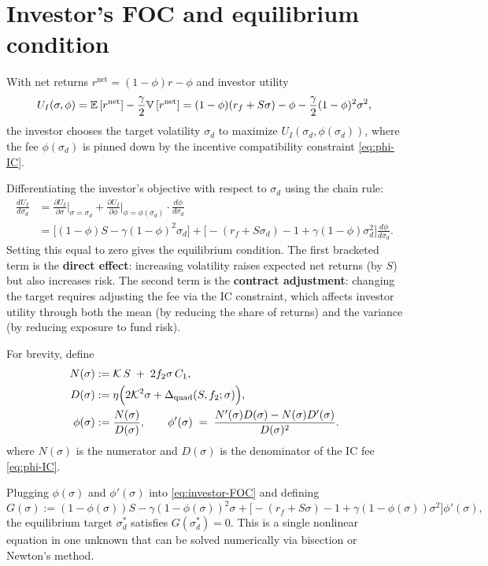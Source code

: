 \section{Investor’s FOC and equilibrium condition}
\label{app:investor}
With net returns $r^{\text{net}}=(1-\phi)r-\phi$ and investor utility
\[
U_I(\sigma,\phi)={\mathbb{E}}\,[r^{\text{net}}] - \frac{\gamma}{2}{\mathbb{V}}\,[r^{\text{net}}] = (1-\phi)(r_f+S\sigma)-\phi-\frac{\gamma}{2}(1-\phi)^2\sigma^2,
\]
the investor chooses the target volatility $\sigma_d$ to maximize $U_I(\sigma_d,\phi(\sigma_d))$, where the fee $\phi(\sigma_d)$ is pinned down by the incentive compatibility constraint \eqref{eq:phi-IC}.

Differentiating the investor's objective with respect to $\sigma_d$ using the chain rule:
\begin{align}
\frac{d U_I}{d \sigma_d} &= \frac{\partial U_I}{\partial \sigma}\Big|_{\sigma=\sigma_d} + \frac{\partial U_I}{\partial \phi}\Big|_{\phi=\phi(\sigma_d)} \cdot \frac{d\phi}{d\sigma_d} \nonumber\\
&= \Big[(1-\phi)S - \gamma(1-\phi)^2\sigma_d\Big] + \Big[-(r_f+S\sigma_d) -1 + \gamma(1-\phi)\sigma_d^2\Big]\frac{d\phi}{d\sigma_d}.\label{eq:investor-FOC}
\end{align}
Setting this equal to zero gives the equilibrium condition. The first bracketed term is the \textbf{direct effect}: increasing volatility raises expected net returns (by $S$) but also increases risk. The second term is the \textbf{contract adjustment}: changing the target requires adjusting the fee via the IC constraint, which affects investor utility through both the mean (by reducing the share of returns) and the variance (by reducing exposure to fund risk).

For brevity, define
\begin{align}
N(\sigma) &:= \mathcal{K}\,S \;+\; 2 f_2 \sigma\,C_1, \\
D(\sigma) &:= \eta\Big(2 \mathcal{K}^2 \sigma + \Delta_{\text{quad}}(S,f_2;\sigma)\Big), \\
\phi(\sigma) &:= \frac{N(\sigma)}{D(\sigma)},\qquad
\phi'(\sigma) \;=\; \frac{N'(\sigma)D(\sigma) - N(\sigma)D'(\sigma)}{D(\sigma)^2}.
\end{align}
where $N(\sigma)$ is the numerator and $D(\sigma)$ is the denominator of the IC fee \eqref{eq:phi-IC}.

Plugging $\phi(\sigma)$ and $\phi'(\sigma)$ into \eqref{eq:investor-FOC} and defining
\begin{equation}
G(\sigma) := (1-\phi(\sigma))S - \gamma(1-\phi(\sigma))^2\sigma + \Big[-(r_f+S\sigma) -1 + \gamma(1-\phi(\sigma))\sigma^2\Big]\phi'(\sigma),
\end{equation}
the equilibrium target $\sigma_d^*$ satisfies $G(\sigma_d^*)=0$. This is a single nonlinear equation in one unknown that can be solved numerically via bisection or Newton's method.

